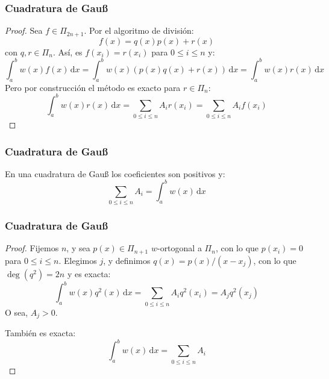 \documentclass[english, spanish, fleqn,%
hyperref = {colorlinks, urlcolor = blue}%
]{beamer}
\begin{document}
\begin{frame}
  \frametitle{Cuadratura de Gauß}

  \begin{proof}
    Sea \(f \in \Pi_{2 n + 1}\).
    Por el algoritmo de división:
    \begin{equation*}
      f(x)
         = q(x) p(x) + r(x)
    \end{equation*}
    con \(q, r \in \Pi_n\).
    Así,
    es \(f(x_i) = r(x_i)\) para \(0 \le i \le n\)
    y:
    \begin{equation*}
      \int_a^b w(x) f(x) \, \mathrm{d} x
        = \int_a^b w(x) (p(x) q(x) + r(x)) \, \mathrm{d} x
        = \int_a^b w(x) r(x) \, \mathrm{d} x
    \end{equation*}
    Pero por construcción el método es exacto para \(r \in \Pi_n\):
    \begin{equation*}
      \int_a^b w(x) r(x) \, \mathrm{d} x
        = \sum_{0 \le i \le n} A_i r(x_i)
        = \sum_{0 \le i \le n} A_i f(x_i)
    \end{equation*}
  \end{proof}
\end{frame}

\begin{frame}
  \frametitle{Cuadratura de Gauß}

  \begin{lemma}
    En una cuadratura de Gauß
    los coeficientes son positivos
    y:
    \begin{equation*}
      \sum_{0 \le i \le n} A_i
        = \int_a^b w(x) \, \mathrm{d} x
    \end{equation*}
  \end{lemma}
\end{frame}

\begin{frame}
  \frametitle{Cuadratura de Gauß}

  \begin{proof}
    Fijemos \(n\),
    y sea \(p(x) \in \Pi_{n + 1}\) \(w\)\nobreakdash-ortogonal a \(\Pi_n\),
    con lo que \(p(x_i) = 0\) para \(0 \le i \le n\).
    Elegimos \(j\), y definimos \(q(x) = p(x) / (x - x_j)\),
    con lo que \(\deg(q^2) = 2 n\) y es exacta:
    \begin{equation*}
      \int_a^b w(x) q^2(x) \, \mathrm{d} x
        = \sum_{0 \le i \le n} A_i q^2(x_i)
        = A_j q^2(x_j)
    \end{equation*}
    O sea,
    \(A_j > 0\).

    También es exacta:
    \begin{equation*}
      \int_a^b w(x) \, \mathrm{d} x
        = \sum_{0 \le i \le n} A_i
    \end{equation*}
  \end{proof}
\end{frame}
\end{document}
